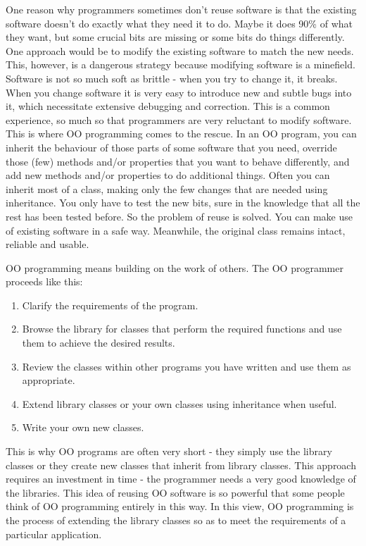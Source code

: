 		One reason why programmers sometimes don't reuse software is that the existing software doesn't do exactly what they need it to do. Maybe it does 90\% of what they want, but some crucial bits are missing or some bits do things differently. One approach would be to modify the existing software to match the new needs. This, however, is a dangerous strategy because modifying software is a minefield. Software is not so much soft as brittle - when you try to change it, it breaks. When you change software it is very easy to introduce new and subtle bugs into it, which necessitate extensive debugging and correction. This is a common experience, so much so that programmers are very reluctant to modify software. This is where OO programming comes to the rescue. In an OO program, you can inherit the behaviour of those parts of some software that you need, override those (few) methods and/or properties that you want to behave differently, and add new methods and/or properties to do additional things. Often you can inherit most of a class, making only the few changes that are needed using inheritance. You only have to test the new bits, sure in the knowledge that all the rest has been tested before. So the problem of reuse is solved. You can make use of existing software in a safe way. Meanwhile, the original class remains intact, reliable and usable.
		
		OO programming means building on the work of others. The OO programmer proceeds like this:
		\begin{enumerate}
			\item	Clarify the requirements of the program.
			\item	Browse the library for classes that perform the required functions and use them to achieve the desired results.
			\item	Review the classes within other programs you have written and use them as appropriate.
			\item	Extend library classes or your own classes using inheritance when useful.
			\item	Write your own new classes.
		\end{enumerate}

		This is why OO programs are often very short - they simply use the library classes or they create new classes that inherit from library classes. This approach requires an investment in time - the programmer needs a very good knowledge of the libraries. This idea of reusing OO software is so powerful that some people think of OO programming entirely in this way. In this view, OO programming is the process of extending the library classes so as to meet the requirements of a particular application.

